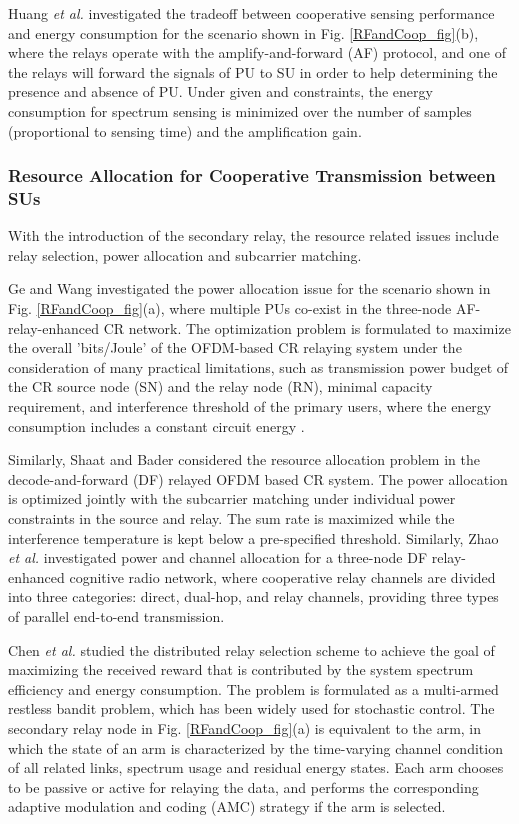\documentclass[journal,12pt,onecolumn]{IEEEtran}
\begin{document}
Huang \emph{et al.} \cite{SSrelay} investigated the tradeoff between cooperative sensing performance and energy consumption for the scenario shown in Fig. \ref{RFandCoop_fig}(b), where the relays operate with the amplify-and-forward (AF) protocol, and one of the relays will forward the signals of PU to SU in order to help determining the presence and absence of PU. Under given  and  constraints, the energy consumption for spectrum sensing is minimized over the number of samples (proportional to sensing time) and the amplification gain.

\subsubsection{Resource Allocation for Cooperative Transmission between SUs} With the introduction of the secondary relay, the resource related issues include relay selection, power allocation and subcarrier matching.

Ge and Wang \cite{relayCR1} investigated the power allocation issue for the scenario shown in Fig. \ref{RFandCoop_fig}(a), where multiple PUs co-exist in the three-node AF-relay-enhanced CR network. The optimization problem is formulated to maximize the overall 'bits/Joule' of the OFDM-based CR relaying system under the consideration of many practical limitations, such as transmission power budget of the CR source node (SN) and the relay node (RN), minimal capacity requirement, and interference threshold of the primary users, where the energy consumption includes a constant circuit energy .

Similarly, Shaat and Bader \cite{relayJoint4} considered the resource allocation problem in the decode-and-forward (DF) relayed OFDM based CR system. The power allocation is optimized jointly with the subcarrier matching under individual power constraints in the source and relay. The sum rate is maximized while the interference temperature is kept below a pre-specified threshold. Similarly, Zhao \emph{et al.} \cite{5484603} investigated power and channel allocation for a three-node DF relay-enhanced cognitive radio network, where cooperative relay channels are divided into three categories: direct, dual-hop, and relay channels, providing three types of parallel end-to-end transmission.

Chen \emph{et al.} \cite{relayJoint2} studied the distributed relay selection scheme to achieve the goal of maximizing the received reward that is contributed by the system spectrum efficiency and energy consumption. The problem is formulated as a multi-armed restless bandit problem, which has been widely used for stochastic control. The secondary relay node in Fig. \ref{RFandCoop_fig}(a) is equivalent to the arm, in which the state of an arm is characterized by the time-varying channel condition of all related links, spectrum usage and residual energy states. Each arm chooses to be passive or active for relaying the data, and performs the corresponding adaptive modulation and coding (AMC) strategy if the arm is selected. 
\end{document}
